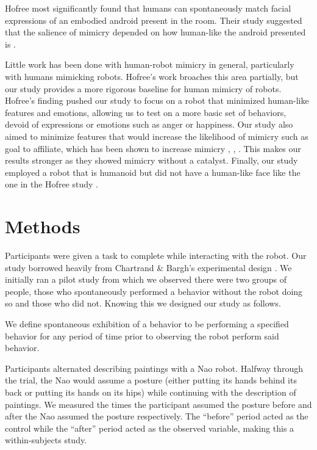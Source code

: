 \documentclass{acm_proc_article-sp}
\begin{document}
Hofree most significantly found that humans can spontaneously match facial expressions of an embodied android present in the room. Their study suggested that the salience of mimicry depended on how human-like the android presented is \cite{hofree2014bridging}.

Little work has been done with human-robot mimicry in general, particularly with humans mimicking robots. Hofree's work broaches this area partially, but our study provides a more rigorous baseline for human mimicry of robots. Hofree's finding pushed our study to focus on a robot that minimized human-like features and emotions, allowing us to test on a more basic set of behaviors, devoid of expressions or emotions such as anger or happiness. Our study also aimed to minimize features that would increase the likelihood of mimicry such as goal to affiliate, which has been shown to increase mimicry \cite{chartrand2013antecedents}, \cite{drury2006effects}, \cite{lakin2003using}. This makes our results stronger as they showed mimicry without a catalyst. Finally, our study employed a robot that is humanoid but did not have a human-like face like the one in the Hofree study \cite{hofree2014bridging}.

\section{Methods} 
Participants were given a task to complete while interacting with the robot. Our study borrowed heavily from Chartrand \& Bargh's experimental design \cite{chartrand1999chameleon}. We initially ran a pilot study from which we observed there were two groups of people, those who spontaneously performed a behavior without the robot doing so and those who did not. Knowing this we designed our study as follows.

We define spontaneous exhibition of a behavior to be performing a specified behavior for any period of time prior to observing the robot perform said behavior. 

Participants alternated describing paintings with a Nao robot. Halfway through the trial, the Nao would assume a posture (either putting its hands behind its back or putting its hands on its hips) while continuing with the description of paintings. We measured the times the participant assumed the posture before and after the Nao assumed the posture respectively. The ``before'' period acted as the control while the ``after'' period acted as the observed variable, making this a within-subjects study.
\end{document}
